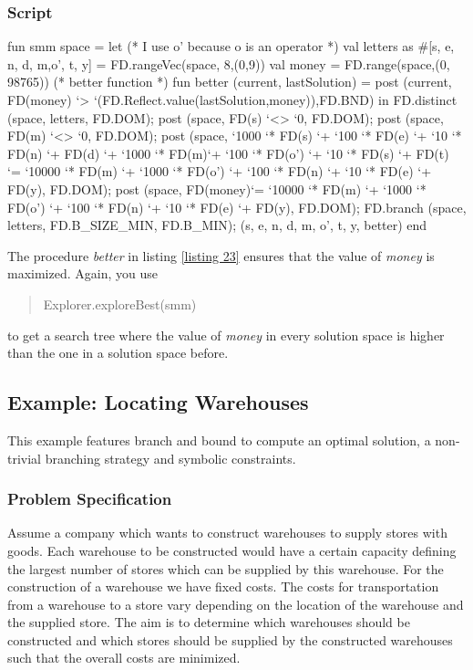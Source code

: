 \documentclass[a4paper,halfparskip]{scrartcl}
\begin{document}
\subsubsection{Script}
\begin{myverbatim}
fun smm space =
  let
    (* I use o' because o is an operator *)
    val letters as #[s, e, n, d, m,o', t, y] = 
        FD.rangeVec(space, 8,(0,9))
    val money = FD.range(space,(0, 98765))
    (* better function *)
    fun better (current, lastSolution) =
         post (current, FD(money) `> 
          `(FD.Reflect.value(lastSolution,money)),FD.BND)
  in
    FD.distinct (space, letters, FD.DOM);
    post (space, FD(s) `<> `0, FD.DOM);
    post (space, FD(m) `<> `0, FD.DOM);
    post (space, `1000 `* FD(s) `+ `100 `* FD(e) `+ 
                 `10 `* FD(n) `+ FD(d) `+  `1000 `* FD(m)`+ 
                 `100 `* FD(o') `+ `10 `* FD(s) `+ FD(t)
             `= `10000 `* FD(m) `+ `1000 `* FD(o') `+ `100 `* 
                  FD(n) `+ `10 `* FD(e) `+ FD(y), FD.DOM);
    post (space, FD(money)`= `10000 `* FD(m) `+ `1000 `* FD(o')
            `+ `100 `* FD(n) `+ `10 `* FD(e) `+ FD(y), FD.DOM);
    FD.branch (space, letters, FD.B_SIZE_MIN, FD.B_MIN);
    ({s, e, n, d, m, o', t, y}, better)
  end
  
\end{myverbatim}

The procedure \emph{better} in listing \ref{listing 23} ensures
that the value of \emph{money} is maximized. Again, you use
\begin{quote}
Explorer.exploreBest(smm)
\end{quote}
to get a search tree where the value of \emph{money} in every 
solution space is higher than the one in a solution space before. 



\newpage
\subsection{Example: Locating Warehouses}
This example features branch and bound to compute an optimal solution, 
a non-trivial branching strategy and symbolic constraints.

\subsubsection{Problem Specification}
Assume a company which wants to construct warehouses to supply 
stores with goods. Each warehouse to be constructed would have 
a certain capacity defining the largest number of stores which 
can be supplied by this warehouse. For the construction of a 
warehouse we have fixed costs. The costs for transportation from 
a warehouse to a store vary depending on the location of the warehouse 
and the supplied store. The aim is to determine which warehouses 
should be constructed and which stores should be supplied by the 
constructed warehouses such that the overall costs are minimized.
\end{document}

